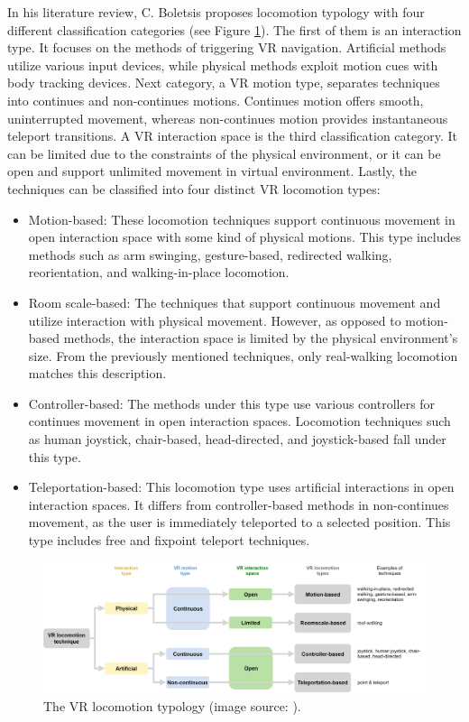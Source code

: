 In his literature review, C. Boletsis proposes locomotion typology with four different classification categories (see Figure \ref{fig:TYPOLOGY}). The first of them is an interaction type. It focuses on the methods of triggering VR navigation. Artificial methods utilize various input devices, while physical methods exploit motion cues with body tracking devices. Next category, a VR motion type, separates techniques into continues and non-continues motions. Continues motion offers smooth, uninterrupted movement, whereas non-continues motion provides instantaneous teleport transitions. A VR interaction space is the third classification category. It can be limited due to the constraints of the physical environment, or it can be open and support unlimited movement in virtual environment. Lastly, the techniques can be classified into four distinct VR locomotion types:

\begin{itemize}
\item Motion-based: These locomotion techniques support continuous movement in open interaction space with some kind of physical motions. This type includes methods such as arm swinging, gesture-based, redirected walking, reorientation, and walking-in-place locomotion.
\item Room scale-based: The techniques that support continuous movement and utilize interaction with physical movement. However, as opposed to motion-based methods, the interaction space is limited by the physical environment's size. From the previously mentioned techniques, only real-walking locomotion matches this description.
\item Controller-based: The methods under this type use various controllers for continues movement in open interaction spaces. Locomotion techniques such as human joystick, chair-based, head-directed, and joystick-based fall under this type.
\item Teleportation-based: This locomotion type uses artificial interactions in open interaction spaces. It differs from controller-based methods in non-continues movement, as the user is immediately teleported to a selected position. This type includes free and fixpoint teleport techniques.
\end{itemize}

\begin{figure}[th]
\centering
\includegraphics[width=1\textwidth]{img/locomotion_typology.png}
\caption{The VR locomotion typology (image source: \cite{LOCOMOTIONREVIEW}).}
\label{fig:TYPOLOGY}
\end{figure}

